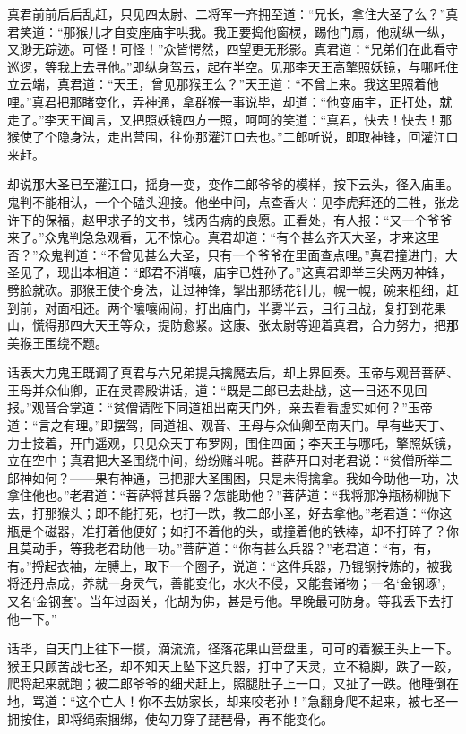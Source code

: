\documentclass[12pt]{lsbook}
\begin{document}
真君前前后后乱赶，只见四太尉、二将军一齐拥至道：“兄长，拿住大圣了么？”真君笑道：“那猴儿才自变座庙宇哄我。我正要捣他窗棂，踢他门扇，他就纵一纵，又渺无踪迹。可怪！可怪！”众皆愕然，四望更无形影。真君道：“兄弟们在此看守巡逻，等我上去寻他。”即纵身驾云，起在半空。见那李天王高擎照妖镜，与哪吒住立云端，真君道：“天王，曾见那猴王么？”天王道：“不曾上来。我这里照着他哩。”真君把那睹变化，弄神通，拿群猴一事说毕，却道：“他变庙宇，正打处，就走了。”李天王闻言，又把照妖镜四方一照，呵呵的笑道：“真君，快去！快去！那猴使了个隐身法，走出营围，往你那灌江口去也。”二郎听说，即取神锋，回灌江口来赶。

却说那大圣已至灌江口，摇身一变，变作二郎爷爷的模样，按下云头，径入庙里。鬼判不能相认，一个个磕头迎接。他坐中间，点查香火：见李虎拜还的三牲，张龙许下的保福，赵甲求子的文书，钱丙告病的良愿。正看处，有人报：“又一个爷爷来了。”众鬼判急急观看，无不惊心。真君却道：“有个甚么齐天大圣，才来这里否？”众鬼判道：“不曾见甚么大圣，只有一个爷爷在里面查点哩。”真君撞进门，大圣见了，现出本相道：“郎君不消嚷，庙宇已姓孙了。”这真君即举三尖两刃神锋，劈脸就砍。那猴王使个身法，让过神锋，掣出那绣花针儿，幌一幌，碗来粗细，赶到前，对面相还。两个嚷嚷闹闹，打出庙门，半雾半云，且行且战，复打到花果山，慌得那四大天王等众，提防愈紧。这康、张太尉等迎着真君，合力努力，把那美猴王围绕不题。

话表大力鬼王既调了真君与六兄弟提兵擒魔去后，却上界回奏。玉帝与观音菩萨、王母并众仙卿，正在灵霄殿讲话，道：“既是二郎已去赴战，这一日还不见回报。”观音合掌道：“贫僧请陛下同道祖出南天门外，亲去看看虚实如何？”玉帝道：“言之有理。”即摆驾，同道祖、观音、王母与众仙卿至南天门。早有些天丁、力士接着，开门遥观，只见众天丁布罗网，围住四面；李天王与哪吒，擎照妖镜，立在空中；真君把大圣围绕中间，纷纷赌斗呢。菩萨开口对老君说：“贫僧所举二郎神如何？——果有神通，已把那大圣围困，只是未得擒拿。我如今助他一功，决拿住他也。”老君道：“菩萨将甚兵器？怎能助他？”菩萨道：“我将那净瓶杨柳抛下去，打那猴头；即不能打死，也打一跌，教二郎小圣，好去拿他。”老君道：“你这瓶是个磁器，准打着他便好；如打不着他的头，或撞着他的铁棒，却不打碎了？你且莫动手，等我老君助他一功。”菩萨道：“你有甚么兵器？”老君道：“有，有，有。”捋起衣袖，左膊上，取下一个圈子，说道：“这件兵器，乃锟钢抟炼的，被我将还丹点成，养就一身灵气，善能变化，水火不侵，又能套诸物；一名‘金钢琢’，又名‘金钢套’。当年过函关，化胡为佛，甚是亏他。早晚最可防身。等我丢下去打他一下。”

话毕，自天门上往下一掼，滴流流，径落花果山营盘里，可可的着猴王头上一下。猴王只顾苦战七圣，却不知天上坠下这兵器，打中了天灵，立不稳脚，跌了一跤，爬将起来就跑；被二郎爷爷的细犬赶上，照腿肚子上一口，又扯了一跌。他睡倒在地，骂道：“这个亡人！你不去妨家长，却来咬老孙！”急翻身爬不起来，被七圣一拥按住，即将绳索捆绑，使勾刀穿了琵琶骨，再不能变化。
\end{document}
